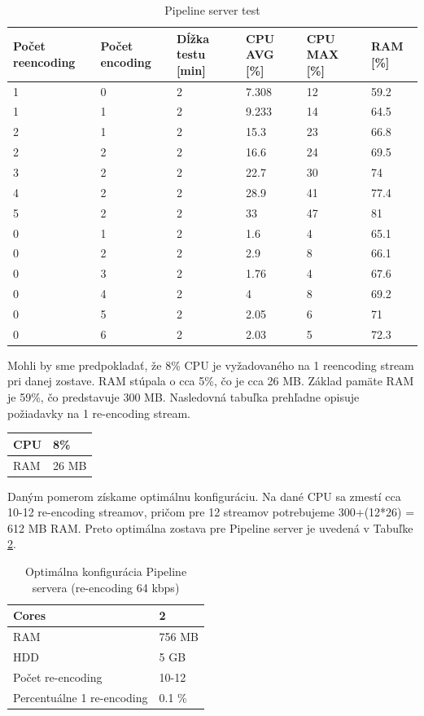\documentclass[11pt]{article}
\begin{document}
\begin{table}[htp]
\centering
\begin{tabular}{|p{2cm}|p{2cm}|p{2cm}|p{2cm}|p{2cm}|p{2cm}|}
\hline
	Počet reencoding & Počet encoding & Dĺžka testu [min] & CPU AVG [\%] & CPU MAX [\%] & RAM [\%]\\
\hline
	1 & 0 & 2 & 7.308 & 12 & 59.2\\
\hline
	1 & 1 & 2 & 9.233 & 14 & 64.5\\
\hline
	2 & 1 & 2 & 15.3 & 23 & 66.8 \\
\hline
	2 & 2 & 2 & 16.6 & 24 & 69.5 \\
\hline
	3 & 2 & 2 & 22.7 & 30 & 74 \\
\hline
	4 & 2 & 2 & 28.9 & 41 & 77.4 \\
\hline
	5 & 2 & 2 & 33 & 47 & 81 \\
\hline
\hline
	0 & 1 & 2 & 1.6 & 4 & 65.1 \\
\hline
	0 & 2 & 2 & 2.9 & 8 & 66.1\\
\hline
	0 & 3 & 2 & 1.76 & 4 & 67.6 \\
\hline
	0 & 4 & 2 & 4 & 8 & 69.2 \\
\hline
	0 & 5 & 2 & 2.05 & 6 & 71 \\
\hline
	0 & 6 & 2 & 2.03 & 5 & 72.3 \\
\hline
\end{tabular}

\caption{Pipeline server test}
\label{red1}
\end{table}

Mohli by sme predpokladať, že 8\% CPU je vyžadovaného na 1 reencoding stream pri danej zostave. RAM stúpala o cca 5\%, čo je cca 26 MB. Základ pamäte RAM je 59\%, čo predstavuje 300 MB. Nasledovná tabuľka prehľadne opisuje požiadavky na 1 re-encoding stream.

\begin{center}
\begin{tabular}{|l|l|}
\hline
	CPU & 8\%\\
\hline
	RAM & 26 MB\\
\hline
\end{tabular}
\end{center}

Daným pomerom získame optimálnu konfiguráciu. Na dané CPU sa zmestí cca 10-12 re-encoding streamov, pričom pre 12 streamov potrebujeme 300+(12*26) = 612 MB RAM. Preto optimálna zostava pre Pipeline server je uvedená v Tabuľke \ref{konf1}.

\begin{table}[htp]
\centering
\begin{tabular}{|l|l|}
\hline
	Cores & 2\\
\hline
	RAM & 756 MB\\
\hline
	HDD & 5 GB\\
\hline
	Počet re-encoding & 10-12\\
\hline
	Percentuálne 1 re-encoding & 0.1 \%\\
\hline
\end{tabular}
\caption{Optimálna konfigurácia Pipeline servera (re-encoding 64 kbps)}
\label{konf1}
\end{table}
\end{document}
